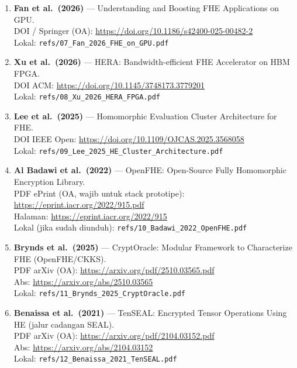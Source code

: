 \documentclass[11pt,a4paper]{article}
\begin{document}
\begin{enumerate}[leftmargin=1.6em,itemsep=0.85em]
  \item \textbf{Fan et al.\ (2026)} --- Understanding and Boosting FHE Applications on GPU.\\
  DOI / Springer (OA): \url{https://doi.org/10.1186/s42400-025-00482-2}\\
  Lokal: \texttt{refs/07\_Fan\_2026\_FHE\_on\_GPU.pdf}

  \item \textbf{Xu et al.\ (2026)} --- HERA: Bandwidth-efficient FHE Accelerator on HBM FPGA.\\
  DOI ACM: \url{https://doi.org/10.1145/3748173.3779201}\\
  Lokal: \texttt{refs/08\_Xu\_2026\_HERA\_FPGA.pdf}

  \item \textbf{Lee et al.\ (2025)} --- Homomorphic Evaluation Cluster Architecture for FHE.\\
  DOI IEEE Open: \url{https://doi.org/10.1109/OJCAS.2025.3568058}\\
  Lokal: \texttt{refs/09\_Lee\_2025\_HE\_Cluster\_Architecture.pdf}

  \item \textbf{Al Badawi et al.\ (2022)} --- OpenFHE: Open-Source Fully Homomorphic Encryption Library.\\
  PDF ePrint (OA, wajib untuk stack prototipe): \url{https://eprint.iacr.org/2022/915.pdf}\\
  Halaman: \url{https://eprint.iacr.org/2022/915}\\
  Lokal (jika sudah diunduh): \texttt{refs/10\_Badawi\_2022\_OpenFHE.pdf}

  \item \textbf{Brynds et al.\ (2025)} --- CryptOracle: Modular Framework to Characterize FHE (OpenFHE/CKKS).\\
  PDF arXiv (OA): \url{https://arxiv.org/pdf/2510.03565.pdf}\\
  Abs: \url{https://arxiv.org/abs/2510.03565}\\
  Lokal: \texttt{refs/11\_Brynds\_2025\_CryptOracle.pdf}

  \item \textbf{Benaissa et al.\ (2021)} --- TenSEAL: Encrypted Tensor Operations Using HE (jalur cadangan SEAL).\\
  PDF arXiv (OA): \url{https://arxiv.org/pdf/2104.03152.pdf}\\
  Abs: \url{https://arxiv.org/abs/2104.03152}\\
  Lokal: \texttt{refs/12\_Benaissa\_2021\_TenSEAL.pdf}
\end{enumerate}
\end{document}
